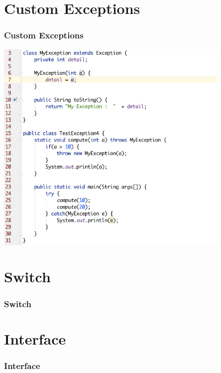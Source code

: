 \documentclass{beamer}
\begin{document}
\section{Custom Exceptions}

\begin{frame}
\frametitle{Custom Exceptions}
\includegraphics[width=0.85\textwidth]{CustomException.png}
\end{frame}



\section{Switch}

\begin{frame}
\frametitle{Switch}
\end{frame}




\section{Interface}

\begin{frame}
\frametitle{Interface}
\end{frame}
\end{document}
